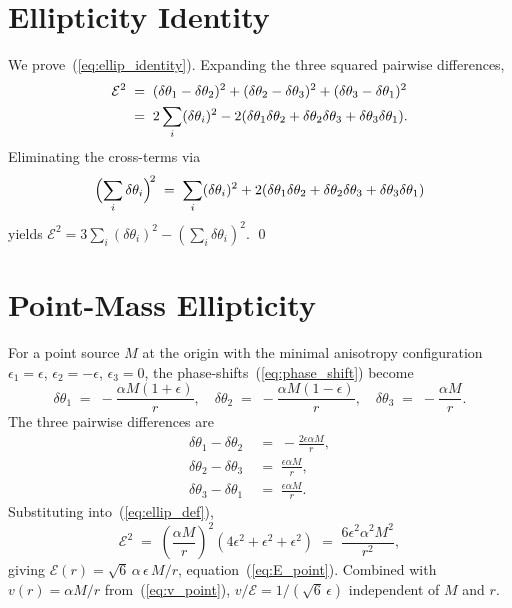 \documentclass[a4paper,fleqn]{cas-dc}
\theoremstyle{thmstyleone}%
\theoremstyle{thmstyletwo}%
\begin{document}
\section{Ellipticity Identity}
\label{app:ellipticity}

We prove~(\ref{eq:ellip_identity}). Expanding the three squared
pairwise differences,
\begin{align}
    \mathcal{E}^2
    &\;=\;
    (\delta\theta_1-\delta\theta_2)^2
    +(\delta\theta_2-\delta\theta_3)^2
    +(\delta\theta_3-\delta\theta_1)^2
    \notag\\
    &\;=\;
    2\sum_{i}(\delta\theta_i)^2
    -2(\delta\theta_1\delta\theta_2
    +\delta\theta_2\delta\theta_3
    +\delta\theta_3\delta\theta_1).
\end{align}
Eliminating the cross-terms via
\begin{equation}
    \Bigl(\sum_i\delta\theta_i\Bigr)^{\!2}
    \;=\;
    \sum_i(\delta\theta_i)^2
    +2(\delta\theta_1\delta\theta_2
    +\delta\theta_2\delta\theta_3
    +\delta\theta_3\delta\theta_1)
\end{equation}
yields
$\mathcal{E}^2=3\sum_i(\delta\theta_i)^2
-(\sum_i\delta\theta_i)^2$. \qed

\section{Point-Mass Ellipticity}
\label{app:point_ellip}

For a point source $M$ at the origin with the minimal
anisotropy configuration $\epsilon_1=\epsilon$,
$\epsilon_2=-\epsilon$, $\epsilon_3=0$, the
phase-shifts~(\ref{eq:phase_shift}) become
\begin{equation}
    \delta\theta_1\;=\;-\frac{\alpha M(1+\epsilon)}{r},
    \quad
    \delta\theta_2\;=\;-\frac{\alpha M(1-\epsilon)}{r},
    \quad
    \delta\theta_3\;=\;-\frac{\alpha M}{r}.
\end{equation}
The three pairwise differences are
\begin{equation}
\begin{split}
    \delta\theta_1-\delta\theta_2
    &\;=\;-\frac{2\epsilon\alpha M}{r}, \\
    \delta\theta_2-\delta\theta_3
    &\;=\;\frac{\epsilon\alpha M}{r}, \\
    \delta\theta_3-\delta\theta_1
    &\;=\;\frac{\epsilon\alpha M}{r}.
\end{split}
\end{equation}
Substituting into~(\ref{eq:ellip_def}),
\begin{equation}
    \mathcal{E}^2
    \;=\;
    \left(\frac{\alpha M}{r}\right)^{\!2}
    (4\epsilon^2+\epsilon^2+\epsilon^2)
    \;=\;
    \frac{6\epsilon^2\alpha^2 M^2}{r^2},
\end{equation}
giving $\mathcal{E}(r)=\sqrt{6}\,\alpha\,\epsilon\,M/r$,
equation~(\ref{eq:E_point}). Combined with
$v(r)=\alpha M/r$ from~(\ref{eq:v_point}),
$v/\mathcal{E}=1/(\sqrt{6}\,\epsilon)$ independent of $M$ and
$r$.
\end{document}
